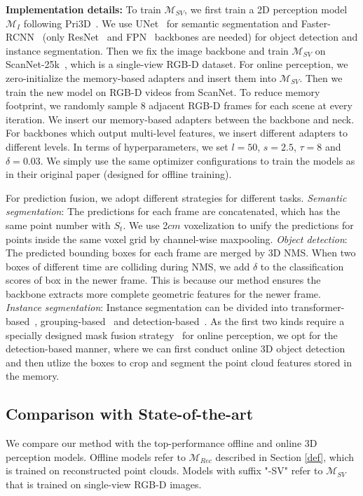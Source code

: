 \textbf{Implementation details:} To train $\mathcal{M}_{SV}$, we first train a 2D perception model $\mathcal{M}_{I}$ following Pri3D~\cite{hou2021pri3d}. We use UNet~\cite{ronneberger2015u} for semantic segmentation and Faster-RCNN~\cite{ren2016faster} (only ResNet~\cite{he2016deep} and FPN~\cite{lin2017fpn} backbones are needed) for object detection and instance segmentation. Then we fix the image backbone and train $\mathcal{M}_{SV}$ on ScanNet-25k~\cite{dai2017scannet}, which is a single-view RGB-D dataset. For online perception, we zero-initialize the memory-based adapters and insert them into $\mathcal{M}_{SV}$. Then we train the new model on RGB-D videos from ScanNet. To reduce memory footprint, we randomly sample 8 adjacent RGB-D frames for each scene at every iteration.
We insert our memory-based adapters between the backbone and neck. For backbones which output multi-level features, we insert different adapters to different levels. In terms of hyperparameters, we set $l=50$, $s=2.5$, $\tau=8$ and $\delta=0.03$. We simply use the same optimizer configurations to train the models as in their original paper (designed for offline training).

For prediction fusion, we adopt different strategies for different tasks. 
\emph{Semantic segmentation}: The predictions for each frame are concatenated, which has the same point number with $S_t$. We use 2$cm$ voxelization to unify the predictions for points inside the same voxel grid by channel-wise maxpooling. 
\emph{Object detection}: The predicted bounding boxes for each frame are merged by 3D NMS. When two boxes of different time are colliding during NMS, we add $\delta$ to the classification scores of box in the newer frame. This is because our method ensures the backbone extracts more complete geometric features for the newer frame.
\emph{Instance segmentation}: Instance segmentation can be divided into transformer-based~\cite{schult2022mask3d}, grouping-based~\cite{jiang2020pointgroup,vu2022softgroup} and detection-based~\cite{hou20193d,yi2019gspn,kolodiazhnyi2023top}. As the first two kinds require a specially designed mask fusion strategy~\cite{liu2022ins} for online perception, we opt for the detection-based manner, where we can first conduct online 3D object detection and then utlize the boxes to crop and segment the point cloud features stored in the memory.


\subsection{Comparison with State-of-the-art}
We compare our method with the top-performance offline and online 3D perception models. Offline models refer to $\mathcal{M}_{Rec}$ described in Section \ref{def}, which is trained on reconstructed point clouds. Models with suffix "-SV" refer to $\mathcal{M}_{SV}$ that is trained on single-view RGB-D images.

